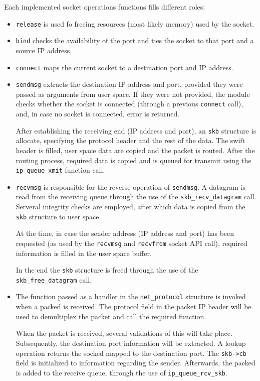 Each implemented socket operations functions fills different roles:

\begin{itemize}
  \item \texttt{release} is used fo freeing resources (most likely memory)
  used by the socket.
  \item \texttt{bind} checks the availability of the port and ties the socket
  to that port and a source IP address.
  \item \texttt{connect} maps the current socket to a destination port and IP
  address.
  \item \texttt{sendmsg} extracts the destination IP address and port,
  provided they were passed as arguments from user space. If they were not
  provided, the module checks whether the socket is connected (through a
  previous \texttt{connect} call), and, in case no socket is connected, error
  is returned.

  After establishing the receiving end (IP address and port), an
  \texttt{skb} structure is allocate, specifying the protocol header and the
  rest of the data. The swift header is filled, user space data are copied and
  the packet is routed. After the routing process, required data is copied and
  is queued for transmit using the \texttt{ip\_queue\_xmit} function call.

  \item \texttt{recvmsg} is responsible for the reverse operation of
  \texttt{sendmsg}. A datagram is read from the receiving queue through the
  use of the \texttt{skb\_recv\_datagram} call. Serveral integrity checks are
  employed, after which data is copied from the \texttt{skb} structure to user
  space.

  At the time, in case the sender address (IP address and port) has been
  requested (as used by the \texttt{recvmsg} and \texttt{recvfrom} socket API
  call), required information is filled in the user space buffer.

  In the end the \texttt{skb} structure is freed through the use of the
  \texttt{skb\_free\_datagram} call.

  \item The function passed as a handler in the \texttt{net\_protocol}
  structure is invoked when a packed is received. The protocol field in the
  packet IP header will be used to demultiplex the packet and call the
  required function.

  When the packet is received, several validations of this will take place.
  Subsequently, the destination port information will be extracted. A lookup
  operation returns the socked mapped to the destination port. The
  \texttt{skb->cb} field is initialized to information regarding the sender.
  Afterwards, the packed is added to the receive queue, through the use of
  \texttt{ip\_queue\_rcv\_skb}.
\end{itemize}

